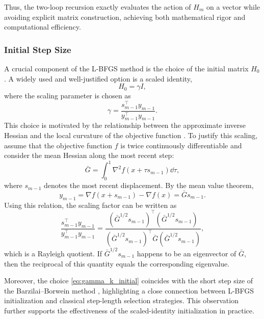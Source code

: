 \documentclass[0_en]{subfiles}
\begin{document}
Thus, the two-loop recursion exactly evaluates the action of $H_m$ on a vector while avoiding explicit matrix construction, achieving both mathematical rigor and computational efficiency.

\subsubsection{Initial Step Size}

A crucial component of the L-BFGS method is the choice of the initial matrix $H_0$.
A widely used and well-justified option is a scaled identity,
\begin{equation}
    H_0 = \gamma I,
\end{equation}
where the scaling parameter is chosen as
\begin{equation}
    \gamma = \frac{s_{m-1}^\top y_{m-1}}{y_{m-1}^\top y_{m-1}}.
    \label{eq:gamma_k_initial}
\end{equation}
This choice is motivated by the relationship between the approximate inverse Hessian and the local curvature of the objective function \citep{liuLimitedMemoryBFGS1989a,shannoMatrixConditioningNonlinear1978}.
To justify this scaling, assume that the objective function $f$ is twice continuously differentiable and consider the mean Hessian along the most recent step:
\begin{equation}
    \bar{G}
    =
    \int_0^1 \nabla^2 f(x + \tau s_{m-1}) \dd \tau ,
\end{equation}
where $s_{m-1}$ denotes the most recent displacement.
By the mean value theorem,
\begin{equation*}
    y_{m-1}
    =
    \nabla f(x+s_{m-1}) - \nabla f(x)
    =
    \bar{G} s_{m-1}.
\end{equation*}
Using this relation, the scaling factor can be written as
\begin{equation}
    \frac{s_{m-1}^\top y_{m-1}}{y_{m-1}^\top y_{m-1}}
    =
    \frac{(\bar{G}^{1/2} s_{m-1})^\top (\bar{G}^{1/2} s_{m-1})}
    {(\bar{G}^{1/2} s_{m-1})^\top \bar{G} (\bar{G}^{1/2} s_{m-1})},
    \label{eq:rayleigh_form}
\end{equation}
which is a Rayleigh quotient.
If $\bar{G}^{1/2} s_{m-1}$ happens to be an eigenvector of $\bar{G}$, then the reciprocal of this quantity equals the corresponding eigenvalue.

Moreover, the choice \eqref{eq:gamma_k_initial} coincides with the short step size of the Barzilai--Borwein method \citep{barzilaiTwoPointStepSize1988}, highlighting a close connection between L-BFGS initialization and classical step-length selection strategies.
This observation further supports the effectiveness of the scaled-identity initialization in practice.

\ifSubfilesClassLoaded{
    
    
}{}
\end{document}
